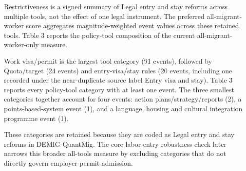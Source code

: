 \documentclass[11pt,a4paper]{article}
\begin{document}
Restrictiveness is a signed summary of Legal entry and stay reforms
across multiple tools, not the effect of one legal instrument. The
preferred all-migrant-worker score aggregates magnitude-weighted event
values across these retained tools. Table 3 reports the policy-tool
composition of the current all-migrant-worker-only measure.

Work visa/permit is the largest tool category (91 events), followed by
Quota/target (24 events) and entry-visa/stay rules (20 events, including
one recorded under the near-duplicate source label
\textquotesingle Entry visa and stay\textquotesingle). Table 3 reports
every policy-tool category with at least one event. The three smallest
categories together account for four events: action
plans/strategy/reports (2), a points-based-system event (1), and a
language, housing and cultural integration programme event (1).

These categories are retained because they are coded as Legal entry and
stay reforms in DEMIG-QuantMig. The core labor-entry robustness check
later narrows this broader all-tools measure by excluding categories
that do not directly govern employer-permit admission.
\end{document}
